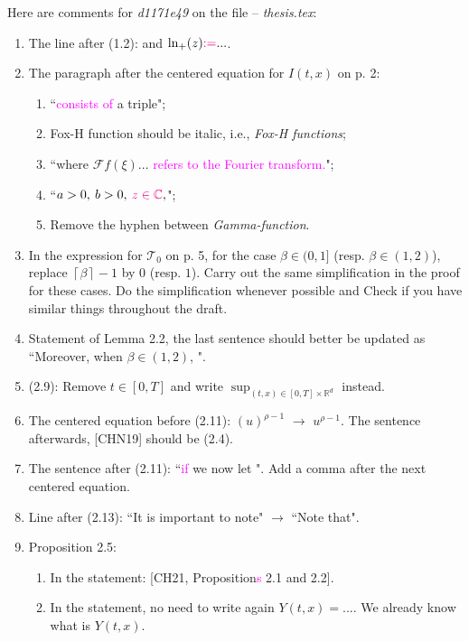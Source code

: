 \documentclass[a4paper,10pt]{article}
\def\R{\mathbb{R}}
\begin{document}
Here are comments for {\it d1171e49} on the file -- {\it thesis.tex}:

\begin{enumerate}
  \item The line after (1.2): and $\ln_+(z) \textcolor{magenta}{:= }...$. 
  \item The paragraph after the centered equation for $I(t,x)$ on p. 2:
    \begin{enumerate}
      \item ``\textcolor{magenta}{consists of} a triple";
      \item Fox-H function should be italic, i.e., {\it  Fox-H functions};
      \item ``where $\mathcal{F}f(\xi) ...$ \textcolor{magenta}{refers to the Fourier transform.}";
      \item ``$a>0,\: b>0, \: \textcolor{magenta}{z\in \mathbb{C}},$";
      \item Remove the hyphen between {\it Gamma-function}.
    \end{enumerate}
  \item In the expression for $\mathcal{T}_0$ on p. 5, for the case $\beta\in (0,1]$ (resp. $\beta\in (1,2)$), replace  $
    \left\lceil \beta \right\rceil -1 $ by $0$ (resp. $1$). Carry out the same simplification in the proof for these
    cases. Do the simplification whenever possible and Check if you have similar things throughout the draft.
  \item Statement of Lemma 2.2, the last sentence should better be updated as ``Moreover, when $\beta\in (1,2)$, ".
  \item (2.9): Remove $t\in [0,T]$ and write $\displaystyle \sup_{(t,x)\in[0,T]\times\R^d}$ instead.
  \item The centered equation before (2.11): $(u)^{\rho-1}$ $\to$  $u^{\rho-1}$. The sentence afterwards, [CHN19] should be
    (2.4). 
  \item The sentence after (2.11): ``\textcolor{magenta}{if} we now let ". Add a comma after the next centered equation.
  \item Line after (2.13): ``It is important to note" $\to$ ``Note that".
  \item Proposition 2.5:
    \begin{enumerate}
      \item In the statement: [CH21, Proposition\textcolor{magenta}{s} 2.1 and 2.2].
      \item In the statement, no need to write again $Y(t,x) = ...$. We already know what is  $Y(t,x)$.

\end{enumerate}
\end{enumerate}
\end{document}
